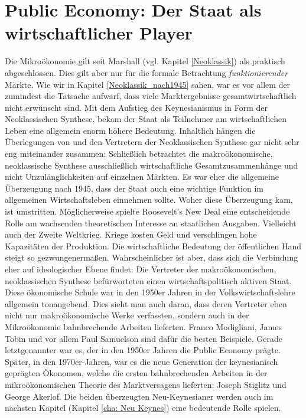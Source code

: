 %
%
%

\chapter{Public Economy: Der Staat als wirtschaftlicher Player} \label{cha: Marktversagen}

Die Mikroökonomie gilt seit Marshall (vgl. Kapitel \ref{Neoklassik}) als praktisch abgeschlossen. Dies gilt aber nur für die formale Betrachtung \textit{funktionierender} Märkte. Wie wir in Kapitel \ref{Neoklassik_nach1945} sahen, war es vor allem \textcite{Pigou1920} der zumindest die Tatsache aufwarf, dass viele Marktergebnisse gesamtwirtschaftlich nicht erwünscht sind. Mit dem Aufstieg des Keynesianismus in Form der Neoklassischen Synthese, bekam der Staat als Teilnehmer am wirtschaftlichen Leben eine allgemein enorm höhere Bedeutung. Inhaltlich hängen die Überlegungen von \textcite{Pigou1920} und den Vertretern der Neoklassischen Synthese gar nicht sehr eng miteinander zusammen: Schließlich betrachtet die makroökonomische, neoklassische Synthese ausschließlich wirtschaftliche Gesamtzusammenhänge und nicht Unzulänglichkeiten auf einzelnen Märkten. Es war eher die allgemeine Überzeugung nach 1945, dass der Staat auch eine wichtige Funktion im allgemeinen Wirtschaftsleben einnehmen sollte. Woher diese Überzeugung kam, ist umstritten. Möglicherweise spielte Roosevelt's New Deal eine entscheidende Rolle am wachsenden theoretischen Interesse an staatlichen Ausgaben. Vielleicht auch der Zweite Weltkrieg. Kriege kosten Geld und verschlingen hohe Kapazitäten der Produktion. Die wirtschaftliche Bedeutung der öffentlichen Hand steigt so gezwungenermaßen. Wahrscheinlicher ist aber, dass sich die Verbindung eher auf ideologischer Ebene findet: Die Vertreter der makroökonomischen, neoklassischen Synthese befürworteten einen wirtschaftspolitisch aktiven Staat. Diese ökonomische Schule war in den 1950er Jahren in der Volkswirtschaftslehre allgemein tonangebend. Dies sieht man auch daran, dass deren Vertreter eben nicht nur makroökonomische Werke verfassten, sondern auch in der Mikroökonomie bahnbrechende Arbeiten lieferten. Franco Modigliani, James Tobin und vor allem Paul Samuelson sind dafür die besten Beispiele. Gerade letztgenannter war es, der in den 1950er Jahren die Public Economy prägte. Später, in den 1970er-Jahren, war es die neue Generation der keynesianisch geprägten Ökonomen, welche die ersten bahnbrechenden Arbeiten in der mikroökonomischen Theorie des Marktversagens lieferten: Joseph Stiglitz und George Akerlof. Die beiden überzeugten Neu-Keynesianer werden auch im nächsten Kapitel (Kapitel \ref{cha: Neu Keynes}) eine bedeutende Rolle spielen.

